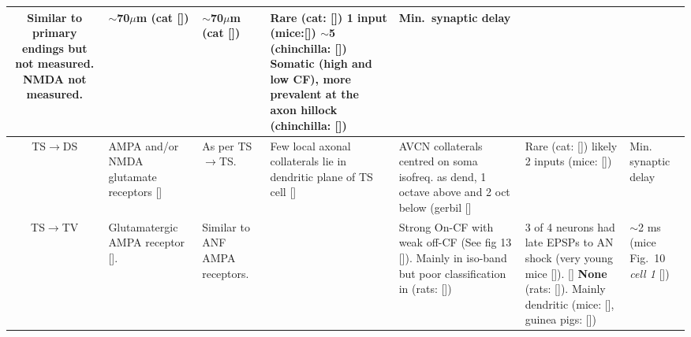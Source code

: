 \begin{longtable}{cYYYYYY}
Similar to primary endings but not measured.  
NMDA not measured.           
                                & 
$\sim$70$\mu$m (cat []) 
                                & %
$\sim$70$\mu$m (cat []) 
                                & %
Rare (cat: []) 
1 input (mice:[])                     
$\sim$5 (chinchilla: [])
Somatic (high and low CF), more prevalent at the axon hillock   
(chinchilla: [])
                                & %
Min.\ synaptic delay \\ \midrule
TS\ensuremath{\rightarrow}DS                        
                                & %
AMPA and/or NMDA glutamate receptors []  
                                & 
As per TS\ensuremath{\rightarrow}TS.
                                & %
Few local axonal collaterals lie in dendritic plane of TS cell []
                                & %
AVCN collaterals centred on soma isofreq. as dend, 1 octave above and 2 oct below (gerbil []
                                & 
Rare  (cat: [])
likely 2 inputs (mice: []) 
                                & 
Min. synaptic delay \\ \midrule
TS\ensuremath{\rightarrow}TV                        
                                & %
Glutamatergic AMPA receptor  [].
                                & 
Similar to ANF AMPA receptors.        
                                & %

                                & %
Strong On-CF with weak off-CF  (See fig 13 []). 
Mainly in iso-band but poor classification in (rats: [])         
                                & %
3 of 4 neurons had late EPSPs to AN shock (very young mice []).
[] 
\textbf{None} (rats: []).
Mainly dendritic (mice: [],
guinea pigs: [])   
                                & %
$\sim$2 ms (mice Fig.~10 \textit{cell 1} [])
\\ \midrule



\end{longtable}

